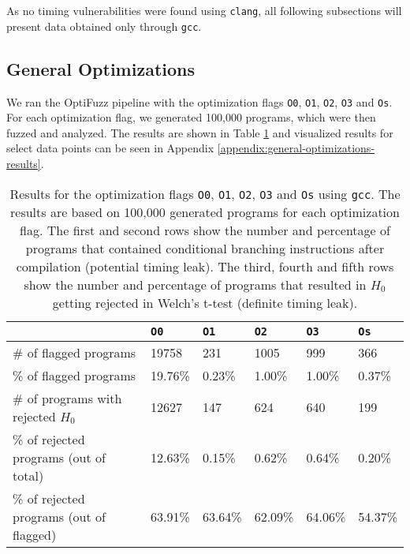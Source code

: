 As no timing vulnerabilities were found using \texttt{clang}, all following subsections will present data obtained only through \texttt{gcc}.

\subsection{General Optimizations}
We ran the OptiFuzz pipeline with the optimization flags \texttt{O0}, \texttt{O1}, \texttt{O2}, \texttt{O3} and \texttt{Os}. 
For each optimization flag, we generated 100,000 programs, which were then fuzzed and analyzed. 
The results are shown in Table \ref{tab:general-optimizations} and visualized results for select data points can be seen in Appendix \ref{appendix:general-optimizations-results}.

\begin{table}[H]
  \centering
  \begin{tabular}{l|lllll}
                                           & \textbf{\texttt{O0}} & \textbf{\texttt{O1}} & \textbf{\texttt{O2}} & \textbf{\texttt{O3}} & \textbf{\texttt{Os}} \\ \hline
  \# of flagged programs                   & 19758                                 & 231                                   & 1005                                  & 999                                   & 366                                   \\
  \% of flagged programs                   & 19.76\%                               & 0.23\%                                & 1.00\%                                & 1.00\%                                & 0.37\%                                \\
  \# of programs with rejected $H_0$       & 12627                                 & 147                                   & 624                                   & 640                                   & 199                                   \\
  \% of rejected programs (out of total)   & 12.63\%                               & 0.15\%                                & 0.62\%                                & 0.64\%                                & 0.20\%                                \\
  \% of rejected programs (out of flagged) & 63.91\%                               & 63.64\%                               & 62.09\%                               & 64.06\%                               & 54.37\%                              
  \end{tabular}
  \caption{Results for the optimization flags \texttt{O0}, \texttt{O1}, \texttt{O2}, \texttt{O3} and \texttt{Os} using \texttt{gcc}. 
  The results are based on 100,000 generated programs for each optimization flag. 
  The first and second rows show the number and percentage of programs that contained conditional branching instructions after compilation (potential timing leak).
  The third, fourth and fifth rows show the number and percentage of programs that resulted in $H_0$ getting rejected in Welch's t-test (definite timing leak).}
  \label{tab:general-optimizations}
\end{table}

